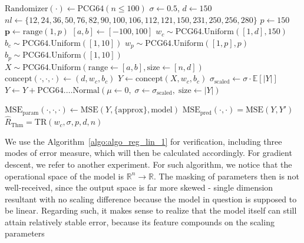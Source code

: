 \begin{algorithm}[htb]
    \caption{Linear regression with Gaussian white noise, full control.}
    \Begin
    {
    $\mathrm{Randomizer}(\cdot)\gets\mathrm{PCG64}(n\leq 100)$
    $\sigma\gets 0.5$, $d\gets 150$
    $nl\gets\{12,24,36,50,76,82,90,100,106,112,121,150,231,250,256,280\}$
    $p\gets 150$
    $\mathbf{p}\gets \mathrm{range}(1,p)$\; $[a,b]\gets [-100,100]$\;
    $w_{c}\sim \mathrm{PCG64}.\mathrm{Uniform}([1,d],150)$\; $b_{c}\sim \mathrm{PCG64}.\mathrm{Uniform}([1,10])$\;
    $w_{p}\sim \mathrm{PCG64}.\mathrm{Uniform}([1,p],p)$\; $b_{p}\sim \mathrm{PCG64}.\mathrm{Uniform}([1,10])$\;
    $X\sim\mathrm{PCG64}.\mathrm{Uniform}(\mathrm{range}\gets[a,b],\mathrm{size}\gets[n,d])$
    $\mathrm{concept}(\cdot,\cdot,\cdot)\gets (d,w_{c},b_{c})$\;
    $Y \gets \mathrm{concept}(X, w_{c},b_{c})$\;
    $\sigma_{\mathrm{scaled}} \gets \sigma \cdot \mathbb{E}\left[\lvert Y\rvert\right]$\;
    $Y \gets Y + \mathrm{PCG64}.…\mathrm{Normal}\left(\mu\gets 0,\;\sigma\gets \sigma_{\mathrm{scaled}},\;\mathrm{size}\gets\lvert Y\rvert\right)$ 

    $\mathrm{MSE}_{\mathrm{param}}(\cdot,\cdot,\cdot)\gets \mathrm{MSE}(Y,\{\mathrm{approx}\},\mathrm{model})$\;
    $\mathrm{MSE}_{\mathrm{pred}}(\cdot,\cdot)=\mathrm{MSE}(Y,Y')$
    $\hat{R}_{\mathrm{Thm}}=\mathrm{TR}(w_{c},\sigma,p,d,n)$\;
    }
    \label{algo:algo_reg_lin_1}
\end{algorithm}

We use the Algorithm~\ref{algo:algo_reg_lin_1} for verification, including three modes of error measure, which will then be calculated accordingly. For gradient descent, we refer to another experiment. For such algorithm, we notice that the operational space of the model is $\mathbb{R}^{n}\to \mathbb{R}$. The masking of parameters then is not well-received, since the output space is far more skewed - single dimension resultant with no scaling difference because the model in question is supposed to be linear. Regarding such, it makes sense to realize that the model itself can still attain relatively stable error, because its feature compounds on the scaling parameters

